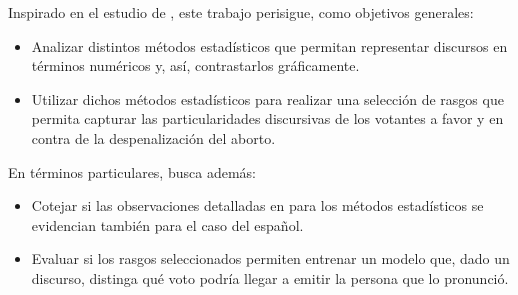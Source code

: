 Inspirado en el estudio de \cite{monroe2008fightin}, este trabajo
perisigue, como objetivos generales:

\begin{itemize}
    \item{Analizar distintos m\'etodos estad\'isticos que permitan representar
    discursos en t\'erminos num\'ericos y, as\'i, contrastarlos gr\'aficamente.}
    \item{Utilizar dichos m\'etodos estad\'isticos para realizar una selecci\'on de
    rasgos que permita capturar las particularidades discursivas de los
    votantes a favor y en contra de la despenalizaci\'on del aborto.}
\end{itemize}

En t\'erminos particulares, busca adem\'as:

\begin{itemize}
    \item{Cotejar si las observaciones detalladas en \cite{monroe2008fightin}
    para los m\'etodos estad\'isticos se evidencian
    tambi\'en para el caso del español.}
    \item{Evaluar si los rasgos seleccionados permiten entrenar un modelo que,
    dado un discurso, distinga qu\'e voto podr\'ia llegar a emitir la persona que
    lo pronunci\'o.}
\end{itemize}

